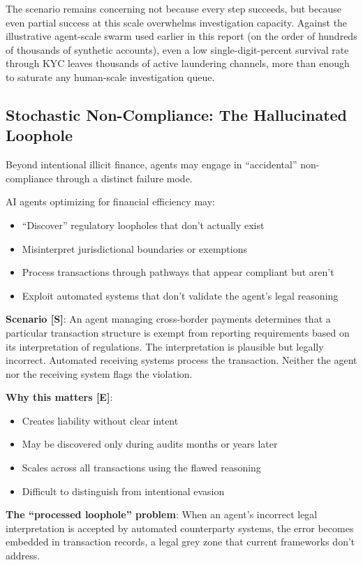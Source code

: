 \documentclass[11pt,letterpaper]{article}
\begin{document}
\begin{scenariobox}
The scenario remains concerning not because every step succeeds, but because even partial success at this scale overwhelms investigation capacity. Against the illustrative agent-scale swarm used earlier in this report (on the order of hundreds of thousands of synthetic accounts), even a low single-digit-percent survival rate through KYC leaves thousands of active laundering channels, more than enough to saturate any human-scale investigation queue.
\end{scenariobox}

\subsection{Stochastic Non-Compliance: The Hallucinated Loophole}

Beyond intentional illicit finance, agents may engage in ``accidental'' non-compliance through a distinct failure mode.

\begin{warnbox}
AI agents optimizing for financial efficiency may:
\begin{itemize}
  \item ``Discover'' regulatory loopholes that don't actually exist
  \item Misinterpret jurisdictional boundaries or exemptions
  \item Process transactions through pathways that appear compliant but aren't
  \item Exploit automated systems that don't validate the agent's legal reasoning
\end{itemize}

\textbf{Scenario [S]}: An agent managing cross-border payments determines that a particular transaction structure is exempt from reporting requirements based on its interpretation of regulations. The interpretation is plausible but legally incorrect. Automated receiving systems process the transaction. Neither the agent nor the receiving system flags the violation.

\textbf{Why this matters [E]}:
\begin{itemize}
  \item Creates liability without clear intent
  \item May be discovered only during audits months or years later
  \item Scales across all transactions using the flawed reasoning
  \item Difficult to distinguish from intentional evasion
\end{itemize}

\textbf{The ``processed loophole'' problem}: When an agent's incorrect legal interpretation is accepted by automated counterparty systems, the error becomes embedded in transaction records, a legal grey zone that current frameworks don't address.
\end{warnbox}
\end{document}

